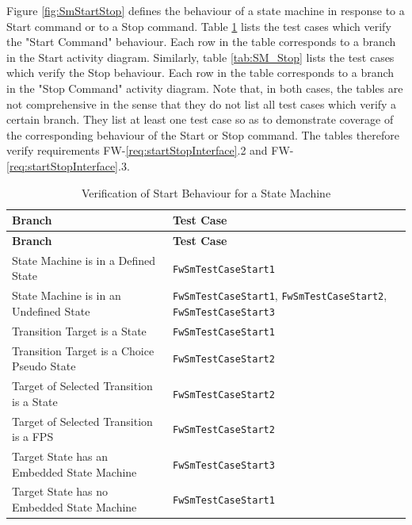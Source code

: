 \documentclass[a4paper,10pt]{article}
\begin{document}
\label{Appendix_C_SM_Start_Stop}
Figure \ref{fig:SmStartStop} defines the behaviour of a state machine in response to a 
Start command or to a Stop command. 
Table \ref{tab:SM_Start} lists the test cases which verify the "Start Command" behaviour. 
Each row in the table corresponds to a branch in the Start activity diagram. 
Similarly, table \ref{tab:SM_Stop} lists the test cases which verify the Stop behaviour. 
Each row in the table corresponds to a branch in the "Stop Command" activity diagram. 
Note that, in both cases, the tables are not comprehensive 
in the sense that they do not list all test cases which verify a certain branch. 
They list at least one test case so as to demonstrate coverage 
of the corresponding behaviour of the Start or Stop command.
The tables therefore verify requirements FW-\ref{req:startStopInterface}.2 and
FW-\ref{req:startStopInterface}.3.

\begin{longtable}{|p{7.7cm}|p{3.5cm}|}
\caption{Verification of Start Behaviour for a State Machine} \label{tab:SM_Start}\\
\hline
\rowcolor{gray}
\textbf{Branch} & \textbf{Test Case} \\
\hline
\endfirsthead
\rowcolor{gray}
\textbf{Branch} & \textbf{Test Case} \\
\hline
\endhead
State Machine is in a Defined State & \texttt{FwSmTestCaseStart1} \\
\hline
State Machine is in an Undefined State & \texttt{FwSmTestCaseStart1}, 
\texttt{FwSmTestCaseStart2}, \texttt{FwSmTestCaseStart3} \\
\hline
Transition Target is a State & \texttt{FwSmTestCaseStart1} \\
\hline
Transition Target is a Choice Pseudo State & \texttt{FwSmTestCaseStart2} \\
\hline
Target of Selected Transition is a State & \texttt{FwSmTestCaseStart2} \\
\hline
Target of Selected Transition is a FPS & \texttt{FwSmTestCaseStart2} \\
\hline
Target State has an Embedded State Machine & \texttt{FwSmTestCaseStart3} \\
\hline
Target State has no Embedded State Machine & \texttt{FwSmTestCaseStart1} \\
\hline
\end{longtable}
\end{document}
